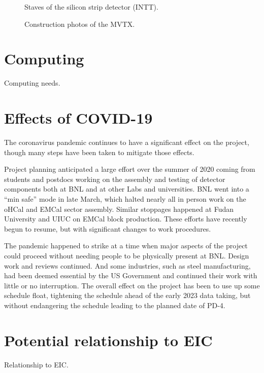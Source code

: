 \begin{figure}[!hbt]
 \begin{center}
        \caption{\label{fig:intt}Staves of the silicon strip detector (INTT).}
 \end{center}
\end{figure}

\begin{figure}[!hbt]
 \begin{center}
        \caption{\label{fig:mvtx}Construction photos of the MVTX.}
 \end{center}
\end{figure}


\section{Computing}
\label{sec:computing}

Computing needs.

\section{Effects of COVID-19}
\label{sec:covid}

The coronavirus pandemic continues to have a significant effect on the
project, though many steps have been taken to mitigate those
effects.

Project planning anticipated a large effort over the summer of 2020
coming from students and postdocs working on the assembly and testing
of detector components both at BNL and at other Labs and universities.
BNL went into a ``min safe'' mode in late March, which halted nearly
all in person work on the oHCal and EMCal sector assembly.  Similar
stoppages happened at Fudan University and UIUC on EMCal block
production.  These efforts have recently begun to resume, but with
significant changes to work procedures.

The pandemic happened to strike at a time when major aspects of the
project could proceed without needing people to be physically present
at BNL.  Design work and reviews continued.  And some industries, such
as steel manufacturing, had been deemed essential by the US Government
and continued their work with little or no interruption.  The overall
effect on the project has been to use up some schedule float,
tightening the schedule ahead of the early 2023 data taking, but
without endangering the schedule leading to the planned date of PD-4.


\section{Potential relationship to EIC}
\label{sec:eic}

Relationship to EIC.

